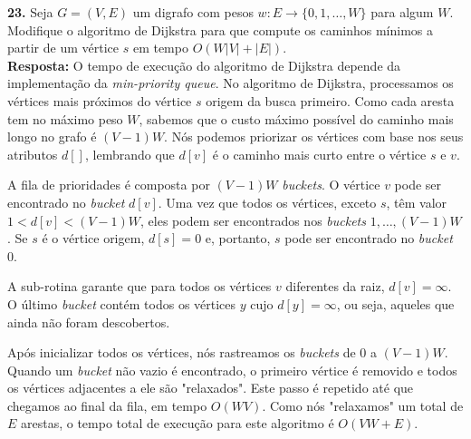 
\noindent\textbf{23.} Seja $G = (V, E)$ um digrafo com pesos $w : E \rightarrow \{0, 1, \ldots , W\}$ para algum $W$. Modifique o algoritmo de Dijkstra para que compute os caminhos mínimos a partir de um vértice $s$ em tempo $O(W|V| + |E|)$.\\[6pt]
\textbf{Resposta:} O tempo de execução do algoritmo de Dijkstra depende da implementação da \textit{min-priority queue}. No algoritmo de Dijkstra, processamos os vértices mais próximos do vértice $s$ origem da busca primeiro. Como cada aresta tem no máximo peso $W$, sabemos que o custo máximo possível do caminho mais longo no grafo é $(V-1)W$. Nós podemos priorizar os vértices com base nos seus atributos $d[]$, lembrando que $d[v]$ é o caminho mais curto entre o vértice $s$ e $v$.

A fila de prioridades é composta por $(V-1)W$ \textit{buckets}. O vértice $v$ pode ser encontrado no \textit{bucket} $d[v]$. Uma vez que todos os vértices, exceto $s$, têm valor $1 < d[v] < (V-1)W$, eles podem ser encontrados nos \textit{buckets} $1, \ldots, (V-1)W$. Se $s$ é o vértice origem, $d[s] = 0$ e, portanto, $s$ pode ser encontrado no \textit{bucket} 0.

A sub-rotina  garante que para todos os vértices $v$ diferentes da raiz, $d[v] = \infty$. O último \textit{bucket} contém todos os vértices $y$ cujo $d[y] = \infty$, ou seja, aqueles que ainda não foram descobertos.

Após inicializar todos os vértices, nós rastreamos os \textit{buckets} de 0 a $(V - 1)W$. Quando um \textit{bucket} não vazio é encontrado, o primeiro vértice é removido e todos os vértices adjacentes a ele são "relaxados". Este passo é repetido até que chegamos ao final da fila, em tempo $O(WV)$. Como nós "relaxamos" um total de $E$ arestas, o tempo total de execução para este algoritmo é $O (VW + E)$.\\[6pt]